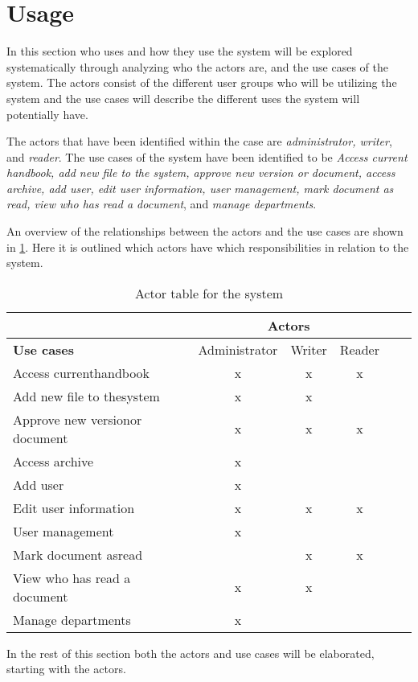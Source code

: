 \section{Usage}\label{sec:Usage}
In this section who uses and how they use the system will be explored systematically through analyzing who the actors are, and the use cases of the system.
The actors consist of the different user groups who will be utilizing the system and the use cases will describe the different uses the system will potentially have.

The actors that have been identified within the case are \textit{administrator, writer}, and \textit{reader}.
The use cases of the system have been identified to be \textit{Access current handbook, add new file to the system, approve new version or document, access archive, add user, edit user information, user management, mark document as read, view who has read a document}, and \textit{manage departments}.

An overview of the relationships between the actors and the use cases are shown in \cref{tab:ActorTable}.
Here it is outlined which actors have which responsibilities in relation to the system.

\begin{table}[H]
	\begin{center}
	\begin{tabular}{| m{10em} | c | c | c | c | c |}
		\hline
		& \multicolumn{3}{c|}{\textbf{Actors}} \\
		\hline
		\textbf{Use cases} & Administrator  & Writer & Reader \\
		\hline
		Access current\newline handbook & x & x & x \\
		\hline
		Add new file to the\newline system & x & x & \\
		\hline
		Approve new version\newline or document & x & x & x \\
		\hline
		Access archive & x & & \\
		\hline
		Add user & x & & \\
		\hline
		Edit user information & x & x & x\\
		\hline
		User management & x & & \\
		\hline
		Mark document as\newline read & & x & x \\
		\hline
		View who has read a document & x & x & \\
		\hline
		Manage departments & x & & \\
		\hline
	\end{tabular}
	\end{center}
	\caption{Actor table for the system}\label{tab:ActorTable}
\end{table}

In the rest of this section both the actors and use cases will be elaborated, starting with the actors.